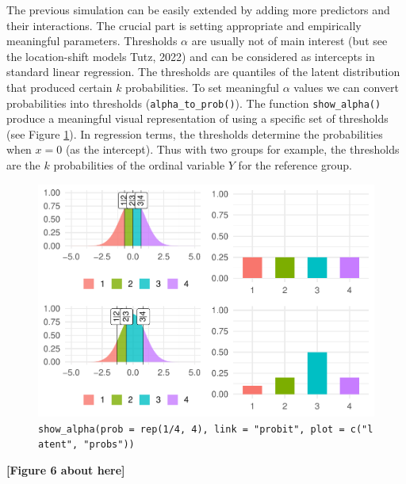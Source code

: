 \documentclass[
  man,floatsintext]{apa6}
\begin{document}
The previous simulation can be easily extended by adding more predictors and their interactions. The crucial part is setting appropriate and empirically meaningful parameters. Thresholds \(\alpha\) are usually not of main interest (but see the location-shift models Tutz, 2022) and can be considered as intercepts in standard linear regression. The thresholds are quantiles of the latent distribution that produced certain \(k\) probabilities. To set meaningful \(\alpha\) values we can convert probabilities into thresholds (\texttt{alpha\_to\_prob()}). The function \texttt{show\_alpha()} produce a meaningful visual representation of using a specific set of thresholds (see Figure \ref{fig:fig-show-th-example}). In regression terms, the thresholds determine the probabilities when \(x = 0\) (as the intercept). Thus with two groups for example, the thresholds are the \(k\) probabilities of the ordinal variable \(Y\) for the reference group.

\scriptsize

\begin{figure}

{\centering \includegraphics{paper_files/figure-latex/fig-show-th-example-1} 

}

\caption{\texttt{show\_alpha(prob\ =\ rep(1/4,\ 4),\ link\ =\ "probit",\ plot\ =\ c("latent",\ "probs"))}}\label{fig:fig-show-th-example}
\end{figure}

\begin{center}\textbf{[Figure 6 about here]} \end{center}

\normalsize
\end{document}
